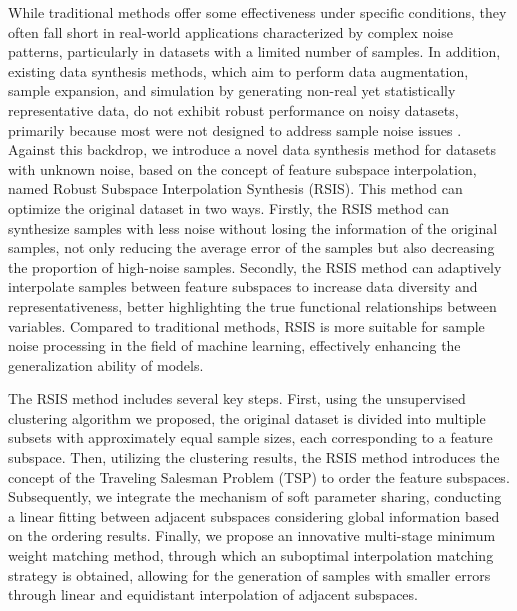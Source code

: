 \documentclass[lettersize,journal]{IEEEtran}
\begin{document}
While traditional methods offer some effectiveness under specific conditions, 
they often fall short in real-world applications characterized by complex noise 
patterns, particularly in datasets with a limited number of samples. In addition, 
existing data synthesis methods, which aim to perform data augmentation, sample expansion, 
and simulation by generating non-real yet statistically representative data, do not 
exhibit robust performance on noisy datasets, primarily because most were not designed to 
address sample noise issues \cite{bib20,bib25,bib32,bib36,bib39}.
Against this backdrop, we introduce 
a novel data synthesis method for datasets with unknown noise, based 
on the concept of feature subspace interpolation, named Robust 
Subspace Interpolation Synthesis (RSIS). This method can optimize 
the original dataset in two ways. Firstly, the RSIS method can 
synthesize samples with less noise without losing the information 
of the original samples, not only reducing the average error of the 
samples but also decreasing the proportion of high-noise samples. 
Secondly, the RSIS method can adaptively interpolate samples between 
feature subspaces to increase data diversity and representativeness, 
better highlighting the true functional relationships between 
variables.  Compared to traditional methods, RSIS is more suitable 
for sample noise processing in the field of machine learning, 
effectively enhancing the generalization ability of models. 

The RSIS method includes several key steps. First, using the 
unsupervised clustering algorithm we proposed, the original dataset 
is divided into multiple subsets with approximately equal sample 
sizes, each corresponding to a feature subspace. Then, utilizing the 
clustering results, the RSIS method introduces the concept of the 
Traveling Salesman Problem (TSP) to order the feature subspaces. 
Subsequently, we integrate the mechanism of soft 
parameter sharing, conducting a linear fitting between 
adjacent subspaces considering global information based 
on the ordering results. Finally, we propose an 
innovative multi-stage minimum weight matching method, 
through which an suboptimal interpolation matching strategy 
is obtained, allowing for the generation of samples with 
smaller errors through linear and equidistant 
interpolation of adjacent subspaces.
\end{document}
